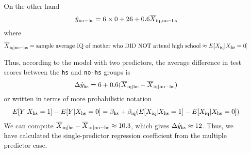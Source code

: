 \begin{example}
On the other hand 
\begin{equation*}
\hat{y}_{\rm no-hs} =  6 \times 0 + 26  +  0.6 \overline{X}_{{\rm iq},{\rm no-hs}} 
\end{equation*}
where 
\begin{equation*}
\overline{X}_{{\rm iq}|{\rm no-hs}}  = \text{sample average IQ of mother who DID NOT attend high school} \approx  E[X_{\rm iq}|X_{\rm hs}=0]
\end{equation*}


Thus, according to the model with two predictors, the average difference in test scores between the \verb!hs! and \verb!no-hs! groups is 
\begin{equation*}
\Delta \hat{y}_{\rm hs} = 6 +0.6(\overline{X}_{{\rm iq}|{\rm hs}}-\overline{X}_{{\rm iq}|{\rm no-hs}} )
\end{equation*}
or written in terms of more probabilistic notation 
\begin{equation*}
E[Y|X_{\rm hs} = 1]-E[Y|X_{\rm hs} = 0]  = \beta_{\rm hs} + \beta_{\rm iq}(E[X_{\rm iq}|X_{\rm hs} = 1]-E[X_{\rm iq}|X_{\rm hs} = 0]  )
\end{equation*}
We can compute $\overline{X}_{{\rm iq}|{\rm hs}}-\overline{X}_{{\rm iq}|{\rm no-hs}} \approx 10.3$, which gives $\Delta \hat{y}_{\rm hs} \approx 12$. Thus, we have calculated the single-predictor regression coefficient from the multiple predictor case.  





\end{example}




  
  
